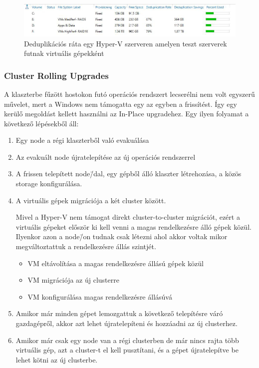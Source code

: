 \documentclass[12pt,oneside,justify,table]{book}
\begin{document}
\begin{figure}
\centering
\includegraphics[width=1\textwidth]{deduplication-ratio-sample}
\caption{Deduplikációs ráta egy Hyper-V szerveren amelyen teszt szerverek futnak virtuális gépekként}
\label{fig:deduplication_ratio}
\end{figure}

\subsubsection{Cluster Rolling Upgrades}

A klaszterbe fűzött hostokon futó operációs rendszert lecserélni nem volt egyszerű művelet, mert a Windows nem támogatta egy az egyben a frissítést. Így egy kerülő megoldást kellett használni az In-Place upgradehez. Egy ilyen folyamat a következő lépésekből áll:
\begin{enumerate}
	\item Egy node a régi klaszterből való evakuálása
	\item Az evakuált node újratelepítése az új operációs rendszerrel
	\item A frissen telepített node\=/dal, egy gépből álló klaszter létrehozása, a közös storage konfigurálása.
 	\item A virtuális gépek migrációja a két cluster között.

Mivel a Hyper-V nem támogat direkt cluster-to-cluster migrációt, ezért a virtuális gépeket először ki kell venni a magas rendelkezésre álló gépek közül. Ilyenkor azon a node\=/on tudnak csak létezni ahol akkor voltak mikor megváltoztattuk a rendelkezésre állás szintjét.
	\begin{itemize}
		
		\item VM eltávolítása a magas rendelkezésre állású gépek közül
		\item VM migrációja az új clusterre
		\item VM konfigurálása magas rendelkezésre állásúvá
	\end{itemize}
	\item Amikor már minden gépet lemozgattuk a következő telepítésre váró gazdagépről, akkor azt lehet újratelepíteni és hozzáadni az új clusterhez.
	\item Amikor már csak egy node van a régi clusterben de már nincs rajta több virtuális gép, azt a cluster-t el kell pusztítani, és a gépet újratelepítve be lehet kötni az új clusterbe.
\end{enumerate}
\end{document}

